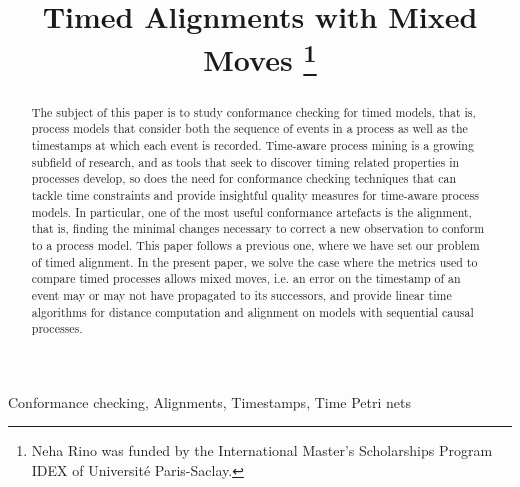 \documentclass[conference]{IEEEtran}
\begin{document}
	\title{Timed Alignments with Mixed Moves
		\thanks{Neha Rino was funded by the International Master's Scholarships Program IDEX of Université Paris-Saclay.}
}


\author{
	\and
}



	\maketitle
	
	\begin{abstract}
		The subject of this paper is to study conformance checking for timed models, that is, process models that consider both the sequence of events in a process as well as the timestamps at which each event is recorded. 
		Time-aware process mining is a growing subfield of research, and as tools that seek to discover timing related properties in processes develop, so does the need for conformance checking techniques that can tackle time constraints and provide insightful quality measures for time-aware process models. 
		In particular, one of the most useful conformance artefacts is the alignment, that is, finding the minimal changes necessary to correct a new observation to conform to a process model.  
		This paper follows a previous one, where we have set our problem of timed alignment. In the present paper, we solve the case where the metrics used to compare timed processes allows mixed moves, i.e. an error on the timestamp of an event may or may not have propagated to its successors, and provide linear time algorithms for distance computation and alignment on models with sequential causal processes. 
	\end{abstract}
	
	\begin{IEEEkeywords}
		Conformance checking, Alignments, Timestamps, Time Petri nets
	\end{IEEEkeywords}
	
\end{document}
